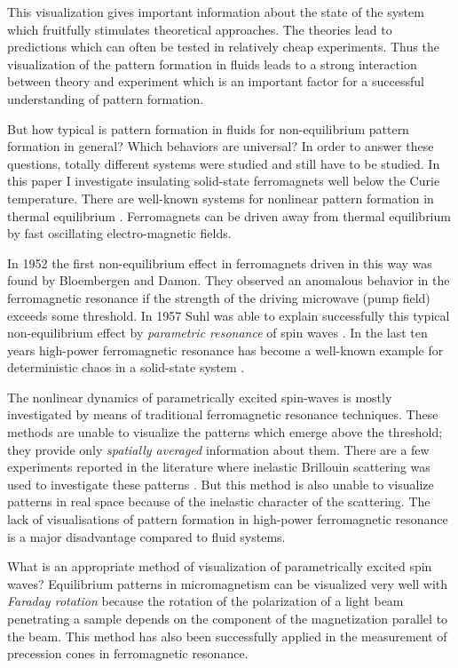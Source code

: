 This visualization gives important information about the state of the
system which fruitfully stimulates theoretical approaches. The
theories lead to predictions which can often be tested in relatively
cheap experiments. Thus the visualization of the pattern formation in
fluids leads to a strong interaction between theory and experiment
which is an important factor for a successful understanding of 
pattern formation.

But how typical is pattern formation in fluids for non-equilibrium
pattern formation in general? Which behaviors are universal? In order
to answer these questions, totally different systems were studied and
still have to be studied. In this paper I investigate insulating
solid-state ferromagnets well below the Curie temperature. There are 
well-known systems for nonlinear pattern formation in thermal
equilibrium \cite{bro.63}. Ferromagnets can be driven away from
thermal equilibrium by fast oscillating electro-magnetic fields.

In 1952 the first non-equilibrium effect in ferromagnets driven in
this way was found by Bloembergen and Damon\cite{blo.52}. They
observed an anomalous behavior in the ferromagnetic resonance if the
strength of the driving microwave (pump field) exceeds some
threshold. In 1957 Suhl was able to explain successfully this typical
non-equilibrium effect by {\em parametric resonance\/} of spin waves
\cite{suh.57}. In the last ten years high-power ferromagnetic
resonance has become a well-known example for deterministic chaos in
a solid-state system \cite{wig.94}.

The nonlinear dynamics of parametrically excited spin-waves is mostly
investigated by means of traditional ferromagnetic resonance
techniques. These methods are unable to visualize the patterns which
emerge above the threshold; they provide only {\em spatially
averaged\/} information about them. There are a few experiments
reported in the literature where inelastic Brillouin scattering was
used to investigate these patterns \cite{gai.75,wet.83}. But this
method is also unable to visualize patterns in real space because of
the inelastic character of the scattering. The lack of visualisations
of pattern formation in high-power ferromagnetic resonance is a major
disadvantage compared to fluid systems. 

What is an appropriate method of visualization of parametrically
excited spin waves? Equilibrium patterns in micromagnetism can be
visualized very well with {\em Faraday rotation\/} because the
rotation of the polarization of a light beam penetrating a sample
depends on the component of the magnetization parallel to the beam.
This method has also been successfully applied in the measurement of
precession cones in ferromagnetic resonance\cite{gna.87}.

